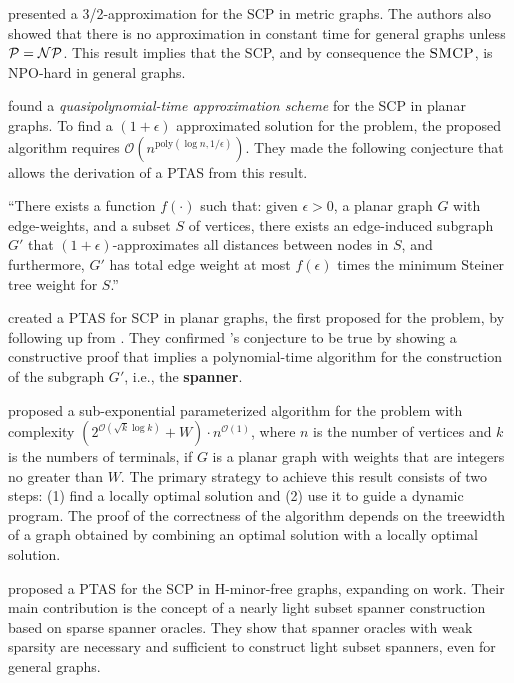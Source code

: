 \cite{SteinovaSteinerCycle} presented a 3/2-approximation for the SCP in metric graphs. The authors also showed that there is no approximation in constant time for general graphs unless \(\mathcal{P} = \mathcal{NP}\). This result implies that the SCP, and by consequence the \(\textsc{SMCP}\), is NPO-hard in general graphs.

\cite{Arora1998APA} found a \textit{quasipolynomial-time approximation scheme} for the SCP in planar graphs. To find a \((1 + \epsilon)\) approximated solution for the problem, the proposed algorithm requires \(\mathcal{O}(n^{\mathrm{poly}(\log n, 1/\epsilon)})\). They made the following conjecture that allows the derivation of a PTAS from this result.

``There exists a function \(f(\cdot)\) such that: given \(\epsilon > 0\), a planar graph \(G\) with edge-weights, and a subset \(S\) of vertices, there exists an edge-induced subgraph \(G'\) that \((1 + \epsilon)\)-approximates all distances between nodes in \(S\), and furthermore, \(G'\) has total edge weight at most \(f(\epsilon)\) times the minimum Steiner tree weight for \(S\).''

\cite{klein2006} created a PTAS for SCP in planar graphs, the first proposed for the problem, by following up from \cite{Arora1998APA}. They confirmed \citeauthor{Arora1998APA}'s conjecture to be true by showing a constructive proof that implies a polynomial-time algorithm for the construction of the subgraph \(G'\), i.e., the \textbf{spanner}.

\cite{klein2014} proposed a sub-exponential parameterized algorithm for the problem with complexity \((2^{\mathcal{O}(\sqrt{k} \log{k})} + W) \cdot n^{\mathcal{O}(1)}\), where \(n\) is the number of vertices and \(k\) is the numbers of terminals, if \(G\) is a planar graph with weights that are integers no greater than \(W\). The primary strategy to achieve this result consists of two steps: (1) find a locally optimal solution and (2) use it to guide a dynamic program. The proof of the correctness of the algorithm depends on the treewidth of a graph obtained by combining an optimal solution with a locally optimal solution.

\cite{LeSubsetTspPTAS_H_MinorFree} proposed a PTAS for the SCP in H-minor-free graphs, expanding on \cite{eptas-tsp-h-minor-free} work. Their main contribution is the concept of a nearly light subset spanner construction based on sparse spanner oracles. They show that spanner oracles with weak sparsity are necessary and sufficient to construct light subset spanners, even for general graphs.

